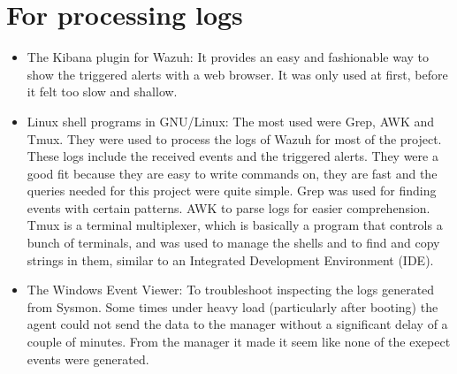 \section{For processing logs}
\begin{itemize}
	\item The Kibana plugin for Wazuh: It provides an easy and fashionable way to show the triggered alerts with a web browser. It was only used at first, before it felt too slow and shallow.
	\item Linux shell programs in GNU/Linux: The most used were Grep, AWK and Tmux. They were used to process the logs of Wazuh for most of the project. These logs include the received events and the triggered alerts. They were a good fit because they are easy to write commands on, they are fast and the queries needed for this project were quite simple. Grep was used for finding events with certain patterns. AWK to parse logs for easier comprehension. Tmux is a terminal multiplexer, which is basically a program that controls a bunch of terminals, and was used to manage the shells and to find and copy strings in them, similar to an Integrated Development Environment (IDE).
	\item The Windows Event Viewer: To troubleshoot inspecting the logs generated from Sysmon. Some times under heavy load (particularly after booting) the agent could not send the data to the manager without a significant delay of a couple of minutes. From the manager it made it seem like none of the exepect events were generated.
\end{itemize}

